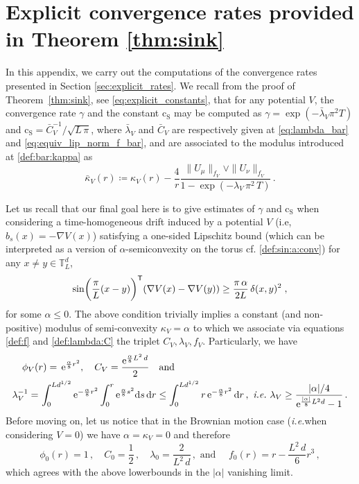 \documentclass[final,12pt]{colt2023} %
\def\ie{\textit{i.e.}}
\newcommand{\bes}{\begin{equation}}
\newcommand{\ees}{\end{equation}}
\newcommand{\De}{\mathrm{d}}
\newcommand{\rme}{\mathrm{e}}
\def\ie{\textit{i.e.}}
\def\eqsp{\;}
\def\cconst{\mathrm{c}_{\mathrm{S}}}
\def\blambda{\bar{\lambda}}
\def\blambdaV{\blambda_V}
\begin{document}
\section{Explicit convergence rates provided in Theorem \ref{thm:sink}}\label{app:explicit:computations}
In this appendix, we carry out the computations of the convergence rates presented in Section \ref{sec:explicit_rates}. We recall from the proof of Theorem~\ref{thm:sink}, see \eqref{eq:explicit_constants}, that for any potential $V$, the convergence rate $\gamma$ and the constant $\cconst$ may be computed as $\gamma=\exp(-\blambdaV \pi^2 T)$ and  $\cconst=\bar{C}_V^{-1}/\sqrt{L\, \pi}$, where $\blambdaV$ and $\bar{C}_V$ are respectively given at \eqref{eq:lambda_bar} and \eqref{eq:equiv_lip_norm_f_bar}, and are associated to the modulus introduced at \eqref{def:bar:kappa} as
\bes
\bar{\kappa}_V (r)\coloneqq\kappa_V(r)-\frac4r\frac{\|U_{\mu}\|_{f_V}\vee\|U_{\nu}\|_{f_V}}{1-\exp(-\lambda_V \,\pi^2\,T)}\,.
\ees

Let us recall that our final goal here is to give estimates of $\gamma$ and $\cconst$ when considering a time-homogeneous drift induced by a potential $V$ (i.e, $b_s(x)=-\nabla V(x)$) satisfying a one-sided Lipschitz bound (which can be interpreted as a version of $\alpha$-semiconvexity on the torus cf. \eqref{def:sin:a:conv}) for any $ x\neq y\in\mathbb{T}_L^d$,
\bes
\sin\biggl(\frac{\pi}{L}(x-y)\biggr)^{{\sf  T}}(\nabla V(x)-\nabla V(y))\geq\frac{\pi\,\alpha}{2L}\,\delta(x,y)^2 \eqsp, 
\ees
for some $\alpha\leq 0$. The above condition trivially implies a constant (and non-positive) modulus of semi-convexity $\kappa_V= \alpha$ to which we associate via equations \eqref{def:f} and \eqref{def:lambda:C} the triplet $C_V,\lambda_V,f_V$. Particularly, we have
\bes
\begin{aligned}
\phi_V(&r)=\,\rme^{\frac{\alpha}{8}r^2},\quad C_V=\frac{\rme^{\frac{\alpha}{8}L^2\,d}}{2}\quad\text{and}\\
\lambda_V^{-1}=&\,\int_0^{Ld^{1/2}}\rme^{-\frac{\alpha}{8}r^2}\int_0^r \rme^{\frac{\alpha}{8}s^2}\De s\,\De r\leq \int_0^{Ld^{1/2}}r\,\rme^{-\frac{\alpha}{8}r^2}\,\De r\,,\text{ \ie }\,\,\lambda_V\geq \frac{|\alpha|/4}{\rme^{\frac{|\alpha|}{8}L^2d}-1}\,.
\end{aligned}
\ees
Before moving on, let us notice that in the Brownian motion case (\ie when considering $V=0$) we have $\alpha=\kappa_V=0$ and therefore
\bes
\phi_0(r)=1\,,\quad C_0=\frac12\,,\quad\lambda_0=\frac{2}{L^2\,d}\,,\text{ and }\quad f_0(r)=r-\frac{L^2\,d}{6}r^3\,,
\ees
which agrees with the above lowerbounds in the $|\alpha|$ vanishing limit.
\end{document}
